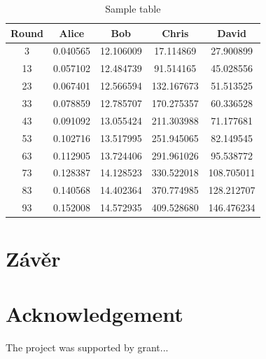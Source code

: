 \documentclass[en]{prtclass}
\begin{document}
\begin{table}[ht]
    \centering
    \caption{Sample table}
    \label{tab:elapsed time}
    \begin{tabular}{|c||c|c|c|c|}
        \hline
        Round & Alice &  Bob & Chris & David \\ 
        \hline 
        3 & 0.040565 & 12.106009 & 17.114869 & 27.900899 \\
        \hline
        13 & 0.057102 & 12.484739 & 91.514165 & 45.028556 \\
        \hline
        23 & 0.067401 & 12.566594 & 132.167673 & 51.513525 \\
        \hline
        33 & 0.078859 & 12.785707 & 170.275357 & 60.336528 \\
        \hline
        43 & 0.091092 & 13.055424 & 211.303988 & 71.177681 \\
        \hline
        53 & 0.102716 & 13.517995 & 251.945065 & 82.149545 \\
        \hline
        63 & 0.112905 & 13.724406 & 291.961026 & 95.538772 \\
        \hline
        73 & 0.128387 & 14.128523 & 330.522018 & 108.705011 \\
        \hline
        83 & 0.140568 & 14.402364 & 370.774985 & 128.212707 \\
        \hline
        93 & 0.152008 & 14.572935 & 409.528680 & 146.476234 \\
        \hline
    \end{tabular}
\end{table}


\section{Závěr}
\blindtext[2]


\section*{Acknowledgement}
The project was supported by grant...



\end{document}
